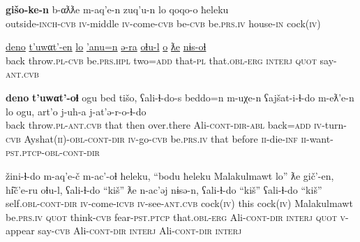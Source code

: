 \documentclass[output=paper]{LSP/langsci}
\begin{document}
\begin{exe}
\gll \textbf{gišo-ke-n} b-αƛƛe m-aq’e-n zuq’u-n lo qoqo-o ħeleku\\
outside-\textsc{inch-cvb} \textsc{iv}-middle \textsc{iv}-come-\textsc{cvb} be-\textsc{cvb} be.\textsc{prs.iv} house-\textsc{in} cock(\textsc{iv})\\
\glt {}
\end{exe}

\begin{exe}
\gll \underline{deno} \underline{t’uwαt’-en} \underline{lo} \underline{’anu=n} \underline{ə-ra} \underline{oɬu-l} \underline{o} \underline{ƛe} \underline{nɨs-oɬ}\\
back throw.\textsc{pl-cvb} be.\textsc{prs.hpl} two=\textsc{add} that-\textsc{pl} that.\textsc{obl-erg} \textsc{interj} \textsc{quot} say-\textsc{ant.cvb} \\
\glt {}
\end{exe}

\begin{exe}
\gll \textbf{deno} \textbf{t’uwαt’-oɬ} ogu bed tišo, ʕali-ɬ-do-s beddo=n m-uχe-n ʕajšat-i-ɬ-do m-eƛ’e-n lo ogu, art’o j-uh-a j-at’ə-r-o-ɬ-do\\
back throw.\textsc{pl-ant.cvb} that then over.there Ali-\textsc{cont-dir-abl} back=\textsc{add} \textsc{iv}-turn-\textsc{cvb} Ayshat(\textsc{ii})-\textsc{obl-cont-dir} \textsc{iv}-go-\textsc{cvb} be.\textsc{prs.iv} that before \textsc{ii}-die-\textsc{inf} \textsc{ii}-want-\textsc{pst.ptcp-obl-cont-dir} \\
\glt {}
\end{exe}

\begin{exe}
\gll žini-ɬ-do m-aq’e-č m-ac’-oɬ ħeleku, “bodu ħeleku Malakulmawt lo” ƛe gič’-en, hi͂č’e-ru oɬu-l, ʕali-ɬ-do “kiš” ƛe n-ac’əj nɨsə-n, ʕali-ɬ-do “kiš” ʕali-ɬ-do “kiš”\\
self.\textsc{obl-cont-dir} \textsc{iv}-come-\textsc{icvb} \textsc{iv}-see-\textsc{ant.cvb} cock(\textsc{iv}) this cock(\textsc{iv}) Malakulmawt be.\textsc{prs.iv} \textsc{quot} think-\textsc{cvb} fear-\textsc{pst.ptcp} that.\textsc{obl-erg} Ali-\textsc{cont-dir} \textsc{interj} \textsc{quot} \textsc{v}-appear say-\textsc{cvb} Ali-\textsc{cont-dir} \textsc{interj} Ali-\textsc{cont-dir} \textsc{interj} \\
\glt {}
\end{exe}
\end{document}
